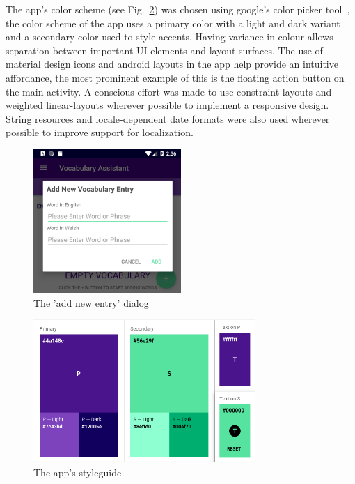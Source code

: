 \documentclass[runningheads]{llncs}
\begin{document}
	The app's color scheme (see Fig.~\ref{styleguide}) was chosen using google's color picker tool~\cite{ref_color_tool}, the color scheme of the app uses a primary color with a light and dark variant and a secondary color used to style accents. Having variance in colour allows separation between important UI elements and layout surfaces. The use of material design icons and android layouts in the app help provide an intuitive affordance, the most prominent example of this is the floating action button on the main activity. A conscious effort was made to use constraint layouts and weighted linear-layouts wherever possible to implement a responsive design. String resources and locale-dependent date formats were also used wherever possible to improve support for localization.
	
	\begin{figure}
		\centering
		\includegraphics[width=0.5\textwidth]{./img/dialog.png}
		\caption{The 'add new entry' dialog}
		\label{dialog}
	\end{figure}
	
	\newpage
	
	\begin{figure}
		\centering
		\includegraphics[width=0.75\textwidth]{./img/styleguide.png}
		\caption{The app's styleguide}
		\label{styleguide}
	\end{figure}
	
\end{document}

